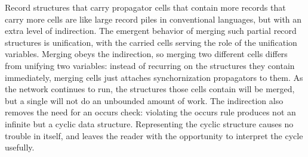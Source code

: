 \documentclass[12pt,letterpaper]{article}
\begin{document}
Record structures that carry propagator cells that contain more
records that carry more cells are like large record piles in
conventional languages, but with an extra level of indirection.  The
emergent behavior of merging such partial record structures is
unification, with the carried cells serving the role of the
unification variables.  Merging obeys the indirection, so merging two
different cells differs from unifying two variables: instead of
recurring on the structures they contain immediately, merging cells
just attaches synchornization propagators to them.  As the network
continues to run, the structures those cells contain will be merged,
but a single  will not do an unbounded amount of work.
The indirection also removes the need for an occurs check:
violating the occurs rule produces not an infinite but a cyclic data
structure.  Representing the cyclic structure causes no trouble in
itself, and leaves the reader with the opportunity to interpret the
cycle usefully.
\end{document}
